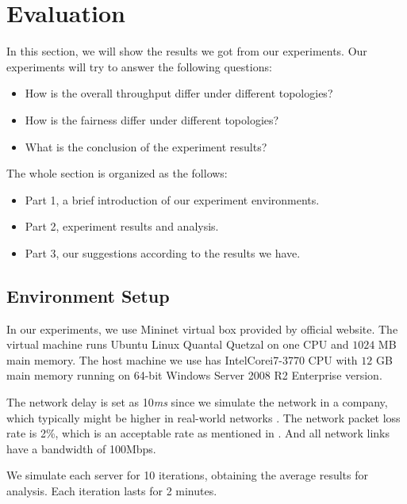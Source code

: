 \section{Evaluation} \label{sec:evaluation}

In this section, we will show the results we got from our experiments. Our experiments will try to 
answer the following questions:
\begin{itemize}
    \item How is the overall throughput differ under different topologies?
    \item How is the fairness differ under different topologies?
    \item What is the conclusion of the experiment results?
\end{itemize}

The whole section is organized as the follows:
\begin{itemize}
    \item Part 1, a brief introduction of our experiment environments.
    \item Part 2, experiment results and analysis.
    \item Part 3, our suggestions according to the results we have.
\end{itemize}

\subsection{Environment Setup} \label{subsec:environment}
In our experiments, we use Mininet virtual box provided by official website\cite{Mininet:official}. 
The virtual machine runs Ubuntu Linux Quantal Quetzal on one CPU and $1024$ MB main memory.
The host machine we use has Intel\textregistered Core\texttrademark i7-3770 CPU with $12$ GB main memory running on
64-bit Windows Server 2008 R2 Enterprise version.

The network delay is set as 10{\it ms} since we simulate the network in a company, 
which typically might be higher in real-world networks \cite{NetworkDelay:web}. 
The network packet loss rate is 2\%, which is an acceptable rate as mentioned in \cite{PacketLoss:wiki}.
And all network links have a bandwidth of 100Mbps. 

We simulate each server for 10 iterations, obtaining the average results for 
analysis. Each iteration lasts for 2 minutes.

